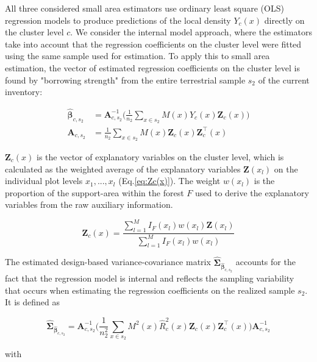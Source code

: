 All three considered small area estimators use ordinary least square (OLS) regression models to produce predictions of the local density $Y_{c}(x)$ directly on the cluster level $c$. We consider the internal model approach, where the estimators take into account that the regression coefficients on the cluster level were fitted using the same sample used for estimation. To apply this to small area estimation, the vector of estimated regression coefficients on the cluster level is found by "borrowing strength" from the entire terrestrial sample $s_2$ of the current inventory:

\begin{subequations}\label{normequ_simple_cluster}
	\begin{align}
	\hat{\pmb{\beta}}_{c,s_2} &= \pmb{A}_{c,s_2}^{-1} \Big(\frac{1}{n_2}\sum_{x\in{s_2}}M(x)Y_{c}(x)\pmb{Z}_{c}(x)\Big) \\
	\pmb{A}_{c,s_2} &=\frac{1}{n_2}\sum_{x\in{s_2}}M(x)\pmb{Z}_{c}(x)\pmb{Z}_{c}^{\top}(x)
	\end{align}
\end{subequations}

\noindent $\pmb{Z}_{c}(x)$ is the vector of explanatory variables on the cluster level, which is calculated as the weighted average of the explanatory variables $\pmb{Z}(x_l)$ on the individual plot levels $x_1, ..., x_l$ (Eq.\ref{eq:Zc(x)}). The weight $w(x_l)$ is the proportion of the support-area within the forest $F$ used to derive the explanatory variables from the raw auxiliary information.

\begin{equation}\label{eq:Zc(x)}
\pmb{Z}_{c}(x)=\frac{\sum_{l=1}^{M}I_{F}(x_l)w(x_l)\pmb{Z}(x_l)}{\sum_{l=1}^{M}I_{F}(x_l)w(x_l)}
\end{equation}

\noindent The estimated design-based variance-covariance matrix $\hat{\pmb{\Sigma}}_{\hat{\pmb{\beta}}_{c,s_2}}$ accounts for the fact that the regression model is internal and reflects the sampling variability that occurs when estimating the regression coefficients on the realized sample $s_2$. It is defined as

\begin{equation}\label{eq:varcovarbeta}
\hat{\pmb{\Sigma}}_{\hat{\pmb{\beta}}_{c,s_2}}=\pmb{A}_{c,s_2}^{-1}
\Big(\frac{1}{n_2^2}\sum_{x\in{s_2}}M^{2}(x)\hat{R}_{c}^2(x)\pmb{Z}_{c}(x)\pmb{Z}_{c}^{\top}(x)\Big)
\pmb{A}_{c,s_2}^{-1}
\end{equation}

\noindent with 


